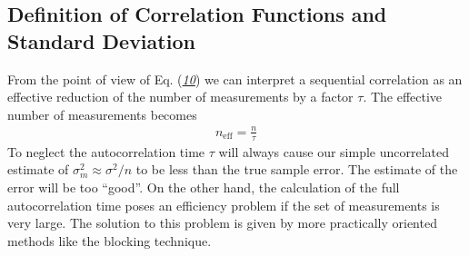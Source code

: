\documentclass[letterpaper,10pt,english]{sphinxmanual}
\begin{document}
\subsection{Definition of Correlation Functions and Standard Deviation}
\label{\detokenize{chapter2:id8}}
From the point of view of
Eq. ({\hyperref[\detokenize{chapter2:eq:error_estimate_corr_time}]{\emph{10}}}) we can interpret a sequential
correlation as an effective reduction of the number of measurements by
a factor \(\tau\). The effective number of measurements becomes
\begin{equation*}
\begin{split}
n_\mathrm{eff} = \frac{n}{\tau}
\end{split}
\end{equation*}
To neglect the autocorrelation time \(\tau\) will always cause our
simple uncorrelated estimate of \(\sigma_m^2\approx \sigma^2/n\) to
be less than the true sample error. The estimate of the error will be
too “good”. On the other hand, the calculation of the full
autocorrelation time poses an efficiency problem if the set of
measurements is very large.  The solution to this problem is given by
more practically oriented methods like the blocking technique.
\end{document}
